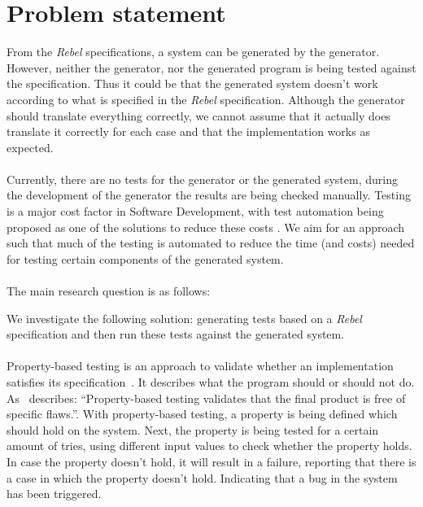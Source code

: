 \section{Problem statement}
From the \textit{Rebel} specifications, a system can be generated by the generator. However, neither the generator, nor the generated program is being tested against the specification. Thus it could be that the generated system doesn't work according to what is specified in the \textit{Rebel} specification. Although the generator should translate everything correctly, we cannot assume that it actually does translate it correctly for each case and that the implementation works as expected.\\
\\
Currently, there are no tests for the generator or the generated system, during the development of the generator the results are being checked manually. Testing is a major cost factor in Software Development, with test automation being proposed as one of the solutions to reduce these costs \cite{ramler2006economic}. We aim for an approach such that much of the testing is automated to reduce the time (and costs) needed for testing certain components of the generated system.\\
\\
The main research question is as follows:
\begin{quote}
  \rqMain
\end{quote}
We investigate the following solution: generating tests based on a \textit{Rebel} specification and then run these tests against the generated system.\\
\\
Property-based testing is an approach to validate whether an implementation satisfies its specification~\cite{fink1997property}. It describes what the program should or should not do. As~\cite{fink1997property} describes: ``Property-based testing validates that the final product is free of specific flaws.''. With property-based testing, a property is being defined which should hold on the system. Next, the property is being tested for a certain amount of tries, using different input values to check whether the property holds. In case the property doesn't hold, it will result in a failure, reporting that there is a case in which the property doesn't hold. Indicating that a bug in the system has been triggered.\\
